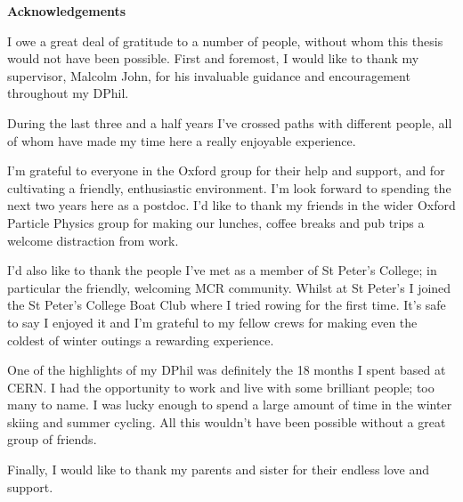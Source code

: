 %
%
%


\begin{alwayssingle} 
    \thispagestyle{empty}
    \begin{center}
        \vspace*{1.5cm}
        {\Large \bfseries Acknowledgements}
    \end{center}
    \vspace{0.5cm}
    I owe a great deal of gratitude to a number of people, without whom this thesis would not have been possible.
    First and foremost, I would like to thank my supervisor, Malcolm John, for his invaluable guidance and encouragement throughout my DPhil.  

    During the last three and a half years I've crossed paths with different people, all of whom have made my time here a really enjoyable experience. 

    I'm grateful to everyone in the Oxford \lhcb group for their help and support, and for cultivating a friendly, enthusiastic environment. I'm look forward to spending the next two years here as a postdoc.
    I'd like to thank my friends in the wider Oxford Particle Physics group for making our lunches, coffee breaks and pub trips a welcome distraction from work. 

    I'd also like to thank the people I've met as a member of St Peter's College; in particular the friendly, welcoming MCR community. Whilst at St Peter's I joined the St Peter's College Boat Club where I tried rowing for the first time. It's safe to say I enjoyed it and I'm grateful to my fellow crews for making even the coldest of winter outings a rewarding experience.     
    
    One of the highlights of my DPhil was definitely the 18 months I spent based at CERN. I had the opportunity to work and live with some brilliant people; too many to name. I was lucky enough to spend a large amount of time in the winter skiing and summer cycling. All this wouldn't have been possible without a great group of friends. 

    Finally, I would like to thank my parents and sister for their endless love and support.   


\end{alwayssingle}
